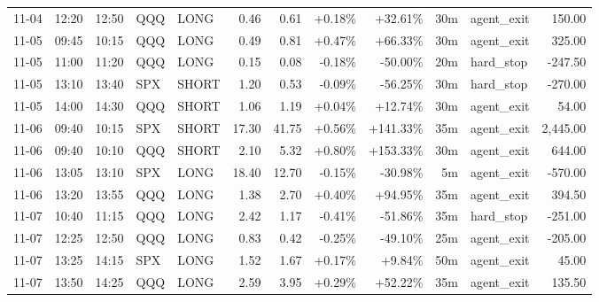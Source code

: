 \documentclass[11pt,a4paper,twoside]{article}
\begin{document}
\begin{center}
\begin{longtable}{>{\color{txtmain}}l l l l l r r r r r >{\color{txtmain}}l r}
11-04 & 12:20 & 12:50 & QQQ & LONG & 0.46 & 0.61 & \textcolor{wingreen}{+0.18\%} & \textcolor{wingreen}{+32.61\%} & 30m & agent\_exit & \textcolor{wingreen}{150.00} \\
11-05 & 09:45 & 10:15 & QQQ & LONG & 0.49 & 0.81 & \textcolor{wingreen}{+0.47\%} & \textcolor{wingreen}{+66.33\%} & 30m & agent\_exit & \textcolor{wingreen}{325.00} \\
11-05 & 11:00 & 11:20 & QQQ & LONG & 0.15 & 0.08 & \textcolor{lossred}{-0.18\%} & \textcolor{lossred}{-50.00\%} & 20m & hard\_stop & \textcolor{lossred}{-247.50} \\
11-05 & 13:10 & 13:40 & SPX & SHORT & 1.20 & 0.53 & \textcolor{lossred}{-0.09\%} & \textcolor{lossred}{-56.25\%} & 30m & hard\_stop & \textcolor{lossred}{-270.00} \\
11-05 & 14:00 & 14:30 & QQQ & SHORT & 1.06 & 1.19 & \textcolor{wingreen}{+0.04\%} & \textcolor{wingreen}{+12.74\%} & 30m & agent\_exit & \textcolor{wingreen}{54.00} \\
11-06 & 09:40 & 10:15 & SPX & SHORT & 17.30 & 41.75 & \textcolor{wingreen}{+0.56\%} & \textcolor{wingreen}{+141.33\%} & 35m & agent\_exit & \textcolor{wingreen}{2,445.00} \\
11-06 & 09:40 & 10:10 & QQQ & SHORT & 2.10 & 5.32 & \textcolor{wingreen}{+0.80\%} & \textcolor{wingreen}{+153.33\%} & 30m & agent\_exit & \textcolor{wingreen}{644.00} \\
11-06 & 13:05 & 13:10 & SPX & LONG & 18.40 & 12.70 & \textcolor{lossred}{-0.15\%} & \textcolor{lossred}{-30.98\%} & 5m & agent\_exit & \textcolor{lossred}{-570.00} \\
11-06 & 13:20 & 13:55 & QQQ & LONG & 1.38 & 2.70 & \textcolor{wingreen}{+0.40\%} & \textcolor{wingreen}{+94.95\%} & 35m & agent\_exit & \textcolor{wingreen}{394.50} \\
11-07 & 10:40 & 11:15 & QQQ & LONG & 2.42 & 1.17 & \textcolor{lossred}{-0.41\%} & \textcolor{lossred}{-51.86\%} & 35m & hard\_stop & \textcolor{lossred}{-251.00} \\
11-07 & 12:25 & 12:50 & QQQ & LONG & 0.83 & 0.42 & \textcolor{lossred}{-0.25\%} & \textcolor{lossred}{-49.10\%} & 25m & agent\_exit & \textcolor{lossred}{-205.00} \\
11-07 & 13:25 & 14:15 & SPX & LONG & 1.52 & 1.67 & \textcolor{wingreen}{+0.17\%} & \textcolor{wingreen}{+9.84\%} & 50m & agent\_exit & \textcolor{wingreen}{45.00} \\
11-07 & 13:50 & 14:25 & QQQ & LONG & 2.59 & 3.95 & \textcolor{wingreen}{+0.29\%} & \textcolor{wingreen}{+52.22\%} & 35m & agent\_exit & \textcolor{wingreen}{135.50} \\

\end{longtable}
\end{center}
\end{document}
